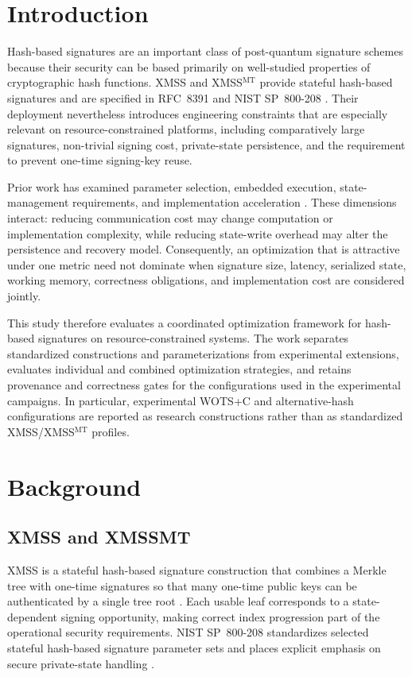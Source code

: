 \documentclass[pdflatex,sn-mathphys-num]{sn-jnl}
\begin{document}
\section{Introduction}
\label{sec:introduction}

Hash-based signatures are an important class of post-quantum
signature schemes because their security can be based primarily on
well-studied properties of cryptographic hash functions. XMSS and
XMSS$^{\mathrm{MT}}$ provide stateful hash-based signatures and are
specified in RFC~8391 and NIST SP~800-208
\cite{RFC8391,NIST800208}. Their deployment nevertheless introduces
engineering constraints that are especially relevant on
resource-constrained platforms, including comparatively large
signatures, non-trivial signing cost, private-state persistence, and
the requirement to prevent one-time signing-key reuse.

Prior work has examined parameter selection, embedded execution,
state-management requirements, and implementation acceleration
\cite{OptimalParametersXMSSMT,McGrew2016StateManagement,
Wang2020XMSSEmbedded,Bos2021RapidXMSS}. These dimensions interact:
reducing communication cost may change computation or implementation
complexity, while reducing state-write overhead may alter the
persistence and recovery model. Consequently, an optimization that is
attractive under one metric need not dominate when signature size,
latency, serialized state, working memory, correctness obligations,
and implementation cost are considered jointly.

This study therefore evaluates a coordinated optimization framework
for hash-based signatures on resource-constrained systems. The work
separates standardized constructions and parameterizations from
experimental extensions, evaluates individual and combined
optimization strategies, and retains provenance and correctness gates
for the configurations used in the experimental campaigns. In
particular, experimental WOTS+C and alternative-hash configurations
are reported as research constructions rather than as standardized
XMSS/XMSS$^{\mathrm{MT}}$ profiles.

\section{Background}
\label{sec:background}

\subsection{XMSS and XMSSMT}
XMSS is a stateful hash-based signature construction that combines
a Merkle tree with one-time signatures so that many one-time public
keys can be authenticated by a single tree root
\cite{Buchmann2011XMSS,RFC8391}. Each usable leaf corresponds to a
state-dependent signing opportunity, making correct index progression
part of the operational security requirements. NIST SP~800-208
standardizes selected stateful hash-based signature parameter sets and
places explicit emphasis on secure private-state handling
\cite{NIST800208}.
\end{document}
